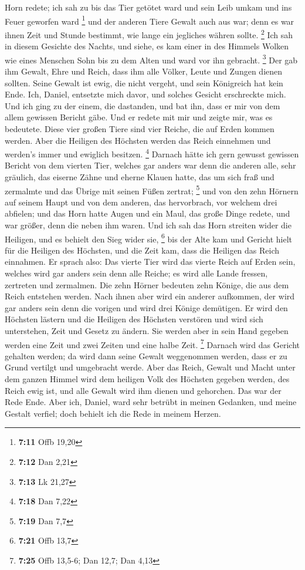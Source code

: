 Horn redete; ich sah zu bis das Tier getötet ward und sein Leib umkam
und ins Feuer geworfen ward \footnote{\textbf{7:11} Offb 19,20}
 und der anderen Tiere Gewalt auch aus war; denn es war
ihnen Zeit und Stunde bestimmt, wie lange ein jegliches währen sollte.
\footnote{\textbf{7:12} Dan 2,21}  Ich sah in diesem
Gesichte des Nachts, und siehe, es kam einer in des Himmels Wolken wie
eines Menschen Sohn bis zu dem Alten und ward vor ihn gebracht.
\footnote{\textbf{7:13} Lk 21,27}  Der gab ihm Gewalt,
Ehre und Reich, dass ihm alle Völker, Leute und Zungen dienen sollten.
Seine Gewalt ist ewig, die nicht vergeht, und sein Königreich hat kein
Ende.  Ich, Daniel, entsetzte mich davor, und solches
Gesicht erschreckte mich.  Und ich ging zu der einem, die
dastanden, und bat ihn, dass er mir von dem allem gewissen Bericht gäbe.
Und er redete mit mir und zeigte mir, was es bedeutete. 
Diese vier großen Tiere sind vier Reiche, die auf Erden kommen werden.
 Aber die Heiligen des Höchsten werden das Reich
einnehmen und werden's immer und ewiglich besitzen. \footnote{\textbf{7:18}
  Dan 7,22}  Darnach hätte ich gern gewusst gewissen
Bericht von dem vierten Tier, welches gar anders war denn die anderen
alle, sehr gräulich, das eiserne Zähne und eherne Klauen hatte, das um
sich fraß und zermalmte und das Übrige mit seinen Füßen zertrat;
\footnote{\textbf{7:19} Dan 7,7}  und von den zehn
Hörnern auf seinem Haupt und von dem anderen, das hervorbrach, vor
welchem drei abfielen; und das Horn hatte Augen und ein Maul, das große
Dinge redete, und war größer, denn die neben ihm waren. 
Und ich sah das Horn streiten wider die Heiligen, und es behielt den
Sieg wider sie, \footnote{\textbf{7:21} Offb 13,7}  bis
der Alte kam und Gericht hielt für die Heiligen des Höchsten, und die
Zeit kam, dass die Heiligen das Reich einnahmen.  Er
sprach also: Das vierte Tier wird das vierte Reich auf Erden sein,
welches wird gar anders sein denn alle Reiche; es wird alle Lande
fressen, zertreten und zermalmen.  Die zehn Hörner
bedeuten zehn Könige, die aus dem Reich entstehen werden. Nach ihnen
aber wird ein anderer aufkommen, der wird gar anders sein denn die
vorigen und wird drei Könige demütigen.  Er wird den
Höchsten lästern und die Heiligen des Höchsten verstören und wird sich
unterstehen, Zeit und Gesetz zu ändern. Sie werden aber in sein Hand
gegeben werden eine Zeit und zwei Zeiten und eine halbe Zeit.
\footnote{\textbf{7:25} Offb 13,5-6; Dan 12,7; Dan 4,13} 
Darnach wird das Gericht gehalten werden; da wird dann seine Gewalt
weggenommen werden, dass er zu Grund vertilgt und umgebracht werde.
 Aber das Reich, Gewalt und Macht unter dem ganzen Himmel
wird dem heiligen Volk des Höchsten gegeben werden, des Reich ewig ist,
und alle Gewalt wird ihm dienen und gehorchen.  Das war
der Rede Ende. Aber ich, Daniel, ward sehr betrübt in meinen Gedanken,
und meine Gestalt verfiel; doch behielt ich die Rede in meinem Herzen.

